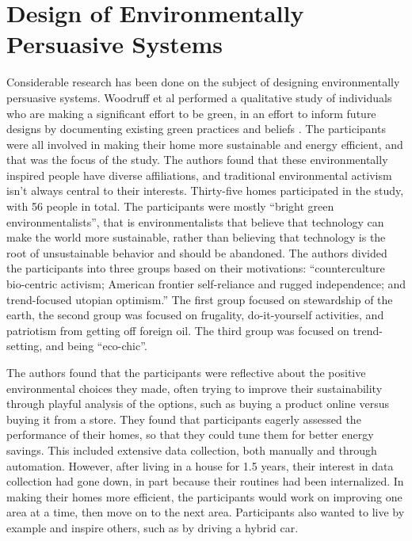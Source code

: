 \section{Design of Environmentally Persuasive Systems}

Considerable research has been done on the subject of designing environmentally persuasive systems. Woodruff et al performed a qualitative study of individuals who are making a significant effort to be green, in an effort to inform future designs by documenting existing green practices and beliefs \cite{Woodruff2008-bright-green}. The participants were all involved in making their home more sustainable and energy efficient, and that was the focus of the study. The authors found that these environmentally inspired people have diverse affiliations, and traditional environmental activism isn't always central to their interests. Thirty-five homes participated in the study, with 56 people in total. The participants were mostly ``bright green environmentalists'', that is environmentalists that believe that technology can make the world more sustainable, rather than believing that technology is the root of unsustainable behavior and should be abandoned. The authors divided the participants into three groups based on their motivations: ``counterculture bio-centric activism; American frontier self-reliance and rugged independence; and trend-focused utopian optimism.'' The first group focused on stewardship of the earth, the second group was focused on frugality, do-it-yourself activities, and patriotism from getting off foreign oil. The third group was focused on trend-setting, and being ``eco-chic''.

The authors found that the participants were reflective about the positive environmental choices they made, often trying to improve their sustainability through playful analysis of the options, such as buying a product online versus buying it from a store. They found that participants eagerly assessed the performance of their homes, so that they could tune them for better energy savings. This included extensive data collection, both manually and through automation. However, after living in a house for 1.5 years, their interest in data collection had gone down, in part because their routines had been internalized. In making their homes more efficient, the participants would work on improving one area at a time, then move on to the next area. Participants also wanted to live by example and inspire others, such as by driving a hybrid car.

